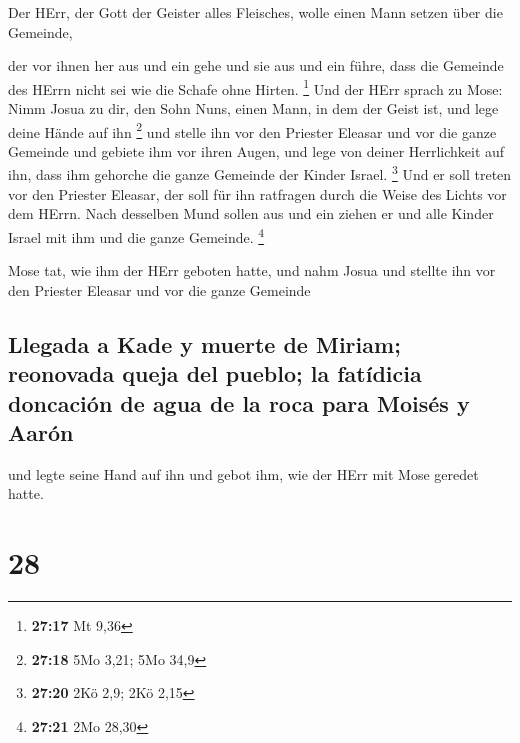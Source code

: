  Der HErr, der Gott der Geister alles Fleisches, wolle
einen Mann setzen über die Gemeinde,

 der vor ihnen her aus und ein gehe und sie aus und ein
führe, dass die Gemeinde des HErrn nicht sei wie die Schafe ohne Hirten.
\footnote{\textbf{27:17} Mt 9,36}  Und der HErr sprach zu
Mose: Nimm Josua zu dir, den Sohn Nuns, einen Mann, in dem der Geist
ist, und lege deine Hände auf ihn \footnote{\textbf{27:18} 5Mo 3,21; 5Mo
  34,9}  und stelle ihn vor den Priester Eleasar und vor
die ganze Gemeinde und gebiete ihm vor ihren Augen,  und
lege von deiner Herrlichkeit auf ihn, dass ihm gehorche die ganze
Gemeinde der Kinder Israel. \footnote{\textbf{27:20} 2Kö 2,9; 2Kö 2,15}
 Und er soll treten vor den Priester Eleasar, der soll
für ihn ratfragen durch die Weise des Lichts vor dem HErrn. Nach
desselben Mund sollen aus und ein ziehen er und alle Kinder Israel mit
ihm und die ganze Gemeinde. \footnote{\textbf{27:21} 2Mo 28,30}

 Mose tat, wie ihm der HErr geboten hatte, und nahm Josua
und stellte ihn vor den Priester Eleasar und vor die ganze Gemeinde

\hypertarget{llegada-a-kade-y-muerte-de-miriam-reonovada-queja-del-pueblo-la-fatuxeddicia-doncaciuxf3n-de-agua-de-la-roca-para-moisuxe9s-y-aaruxf3n}{%
\subsection{Llegada a Kade y muerte de Miriam; reonovada queja del
pueblo; la fatídicia doncación de agua de la roca para Moisés y
Aarón}\label{llegada-a-kade-y-muerte-de-miriam-reonovada-queja-del-pueblo-la-fatuxeddicia-doncaciuxf3n-de-agua-de-la-roca-para-moisuxe9s-y-aaruxf3n}}

 und legte seine Hand auf ihn und gebot ihm, wie der HErr
mit Mose geredet hatte.

\hypertarget{section-27}{%
\section{28}\label{section-27}}

